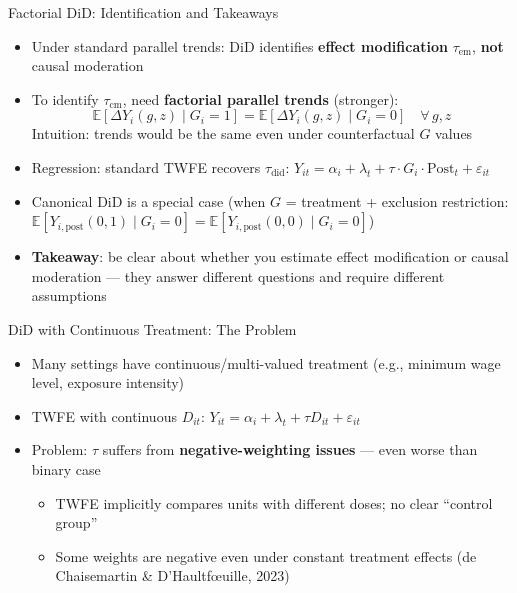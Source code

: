 \documentclass[10pt, handout]{beamer}
\begin{document}
\begin{frame}{Factorial DiD: Identification and Takeaways}
  \begin{itemize}
    \item Under standard parallel trends: DiD identifies \textbf{effect modification} $\tau_{\text{em}}$, \textbf{not} causal moderation
    \item To identify $\tau_{\text{cm}}$, need \textbf{factorial parallel trends} (stronger):
      $$
        \mathbb{E}[\Delta Y_i(g, z) \mid G_i = 1] = \mathbb{E}[\Delta Y_i(g, z) \mid G_i = 0] \quad \forall\, g, z
      $$
      Intuition: trends would be the same even under counterfactual $G$ values
    \item Regression: standard TWFE recovers $\tau_{\text{did}}$:
      $Y_{it} = \alpha_i + \lambda_t + \tau \cdot G_i \cdot \text{Post}_t + \varepsilon_{it}$
    \item Canonical DiD is a special case (when $G$ = treatment + exclusion restriction: $\mathbb{E} \left[ Y_{i, \text{post}}(0, 1) \mid G_i = 0 \right] = \mathbb{E} \left[ Y_{i, \text{post}}(0, 0) \mid G_i = 0 \right]$)
    \item \textbf{Takeaway}: be clear about whether you estimate effect modification or causal moderation --- they answer different questions and require different assumptions
  \end{itemize}
\end{frame}


\begin{frame}{DiD with Continuous Treatment: The Problem}
  \begin{itemize}
    \item Many settings have continuous/multi-valued treatment (e.g., minimum wage level, exposure intensity)
    \item TWFE with continuous $D_{it}$: $Y_{it} = \alpha_i + \lambda_t + \tau D_{it} + \varepsilon_{it}$
    \item Problem: $\hat{\tau}$ suffers from \textbf{negative-weighting issues} --- even worse than binary case
      \begin{itemize}
        \item TWFE implicitly compares units with different doses; no clear ``control group''
        \item Some weights are negative even under constant treatment effects (de Chaisemartin \& D'Haultf\oe uille, 2023)
      \end{itemize}
  \end{itemize}
\end{frame}
\end{document}
